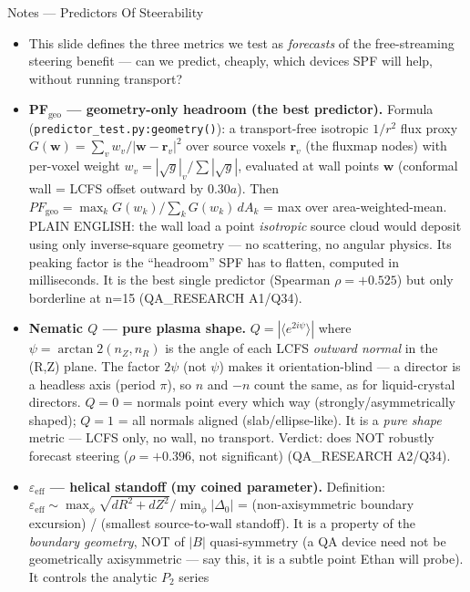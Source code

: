 \documentclass[11pt,aspectratio=169]{beamer}
\begin{document}
\begin{frame}[allowframebreaks]{Notes --- Predictors Of Steerability}
{\color{red}\footnotesize
\begin{itemize}
\item This slide defines the three metrics we test as \emph{forecasts} of the free-streaming steering
      benefit --- can we predict, cheaply, which devices SPF will help, without running transport?
\item \textbf{PF$_\text{geo}$ --- geometry-only headroom (the best predictor).} Formula
      (\texttt{predictor\_test.py:geometry()}): a transport-free isotropic $1/r^2$ flux proxy
      $G(\mathbf{w})=\sum_v w_v/|\mathbf{w}-\mathbf{r}_v|^2$ over source voxels $\mathbf{r}_v$ (the
      fluxmap nodes) with per-voxel weight $w_v=|\sqrt{g}|_v/\sum|\sqrt{g}|$, evaluated at wall points
      $\mathbf{w}$ (conformal wall = LCFS offset outward by $0.30a$). Then $PF_\text{geo}=\max_k G(w_k)/
      \sum_k G(w_k)\,dA_k$ = max over area-weighted-mean. PLAIN ENGLISH: the wall load a point
      \emph{isotropic} source cloud would deposit using only inverse-square geometry --- no scattering,
      no angular physics. Its peaking factor is the ``headroom'' SPF has to flatten, computed in
      milliseconds. It is the best single predictor (Spearman $\rho=+0.525$) but only borderline at
      n=15 (QA\_RESEARCH A1/Q34).
\item \textbf{Nematic $Q$ --- pure plasma shape.} $Q=|\langle e^{2i\psi}\rangle|$ where
      $\psi=\arctan2(n_Z,n_R)$ is the angle of each LCFS \emph{outward normal} in the (R,Z) plane. The
      factor $2\psi$ (not $\psi$) makes it orientation-blind --- a director is a headless axis (period
      $\pi$), so $n$ and $-n$ count the same, as for liquid-crystal directors. $Q=0$ = normals point
      every which way (strongly/asymmetrically shaped); $Q=1$ = all normals aligned (slab/ellipse-like).
      It is a \emph{pure shape} metric --- LCFS only, no wall, no transport. Verdict: does NOT robustly
      forecast steering ($\rho=+0.396$, not significant) (QA\_RESEARCH A2/Q34).
\item \textbf{$\varepsilon_\text{eff}$ --- helical standoff (my coined parameter).} Definition:
      $\varepsilon_\text{eff}\sim \max_\phi\sqrt{dR^2+dZ^2}/\min_\phi|\Delta_0|$ = (non-axisymmetric
      boundary excursion) / (smallest source-to-wall standoff). It is a property of the \emph{boundary
      geometry}, NOT of $|B|$ quasi-symmetry (a QA device need not be geometrically axisymmetric ---
      say this, it is a subtle point Ethan will probe). It controls the analytic $P_2$ series

\end{itemize}}
\end{frame}
\end{document}
